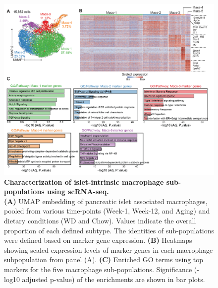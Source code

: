 \begin{figure}[t]
\centering
\includegraphics[width=\linewidth]{Chapter4/Fig/F2-5-01.png}
\caption[res-macs1]{\textbf{Characterization of islet-intrinsic macrophage sub-populations using scRNA-seq.}\\
\textbf{(A)} UMAP embedding of pancreatic islet associated macrophages, pooled from various time-points (Week-1, Week-12, and Aging) and dietary conditions (WD and Chow). Values indicate the overall proportion of each defined subtype. The identities of sub-populations were defined based on marker gene expression. \textbf{(B)} Heatmaps showing scaled expression levels of marker genes in each macrophage subpopulation from panel (A). \textbf{(C)} Enriched GO terms using top markers for the five macrophage sub-populations. Significance (-log10 adjusted p-value) of the enrichments are shown in bar plots.}
\label{fig2-5-1}
\end{figure}




